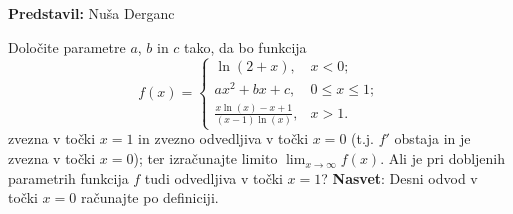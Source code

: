 \textbf{Predstavil:} Nuša Derganc

Določite parametre $a$, $b$ in $c$ tako, da bo funkcija
\[
f(x) = \begin{cases}
\ln (2+x), & x<0; \\
ax^{2} +bx + c, & 0 \leq x \leq 1; \\
\frac{x \ln(x) -x +1}{(x-1)\ln(x)}, & x>1.
\end{cases}
\]
zvezna v točki $x=1$ in zvezno odvedljiva v točki $x = 0$ (t.j. $f'$ obstaja in je zvezna v točki $x=0$); ter izračunajte limito $\lim_{x \to \infty} f(x)$. Ali je pri dobljenih parametrih funkcija $f$ tudi odvedljiva v točki $x=1$? \textbf{Nasvet}: Desni odvod v točki $x=0$ računajte po definiciji.
